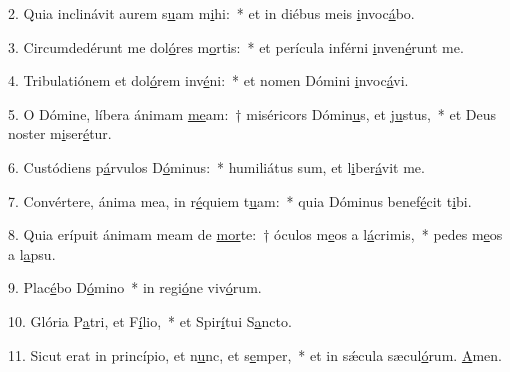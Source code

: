 2. Quia inclinávit aurem s\uline{u}am m\uline{i}hi:~* et in diébus meis \uline{i}nvoc\uline{á}bo.\par 
3. Circumdedérunt me dol\uline{ó}res m\uline{o}rtis:~* et perícula inférni \uline{i}nven\uline{é}runt me.\par 
4. Tribulatiónem et dol\uline{ó}rem inv\uline{é}ni:~* et nomen Dómini \uline{i}nvoc\uline{á}vi.\par 
5. O Dómine, líbera ánimam \uline{me}am:~† miséricors Dómin\uline{u}s, et j\uline{u}stus,~* et Deus noster m\uline{i}ser\uline{é}tur.\par 
6. Custódiens p\uline{á}rvulos D\uline{ó}minus:~* humiliátus sum, et l\uline{i}ber\uline{á}vit me.\par 
7. Convértere, ánima mea, in r\uline{é}quiem t\uline{u}am:~* quia Dóminus benef\uline{é}cit t\uline{i}bi.\par 
8. Quia erípuit ánimam meam de \uline{mor}te:~† óculos m\uline{e}os a l\uline{á}crimis,~* pedes m\uline{e}os a l\uline{a}psu.\par 
9. Plac\uline{é}bo D\uline{ó}mino~* in regi\uline{ó}ne viv\uline{ó}rum.\par 
10. Glória P\uline{a}tri, et F\uline{í}lio,~* et Spir\uline{í}tui S\uline{a}ncto.\par 
11. Sicut erat in princípio, et n\uline{u}nc, et s\uline{e}mper,~* et in sǽcula sæcul\uline{ó}rum. \uline{A}men.\par 
